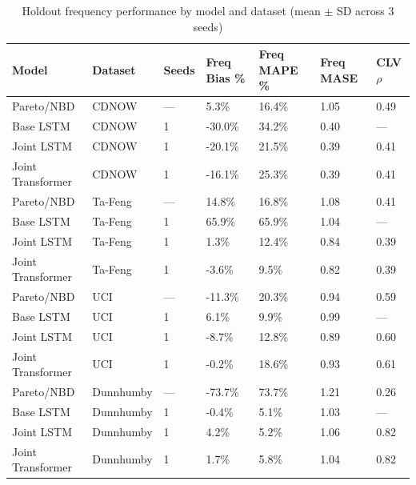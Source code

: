 \begin{table}
\caption{Holdout frequency performance by model and dataset (mean $\pm$ SD across 3 seeds)}
\label{tab:model_comparison_aggregated_freq}
\begin{tabular}{lllllll}
\toprule
Model & Dataset & Seeds & Freq Bias \% & Freq MAPE \% & Freq MASE & CLV $\rho$ \\
\midrule
Pareto/NBD & CDNOW & — & 5.3\% & 16.4\% & 1.05 & 0.49 \\
Base LSTM & CDNOW & 1 & -30.0\% & 34.2\% & 0.40 & — \\
Joint LSTM & CDNOW & 1 & -20.1\% & 21.5\% & 0.39 & 0.41 \\
Joint Transformer & CDNOW & 1 & -16.1\% & 25.3\% & 0.39 & 0.41 \\
Pareto/NBD & Ta-Feng & — & 14.8\% & 16.8\% & 1.08 & 0.41 \\
Base LSTM & Ta-Feng & 1 & 65.9\% & 65.9\% & 1.04 & — \\
Joint LSTM & Ta-Feng & 1 & 1.3\% & 12.4\% & 0.84 & 0.39 \\
Joint Transformer & Ta-Feng & 1 & -3.6\% & 9.5\% & 0.82 & 0.39 \\
Pareto/NBD & UCI & — & -11.3\% & 20.3\% & 0.94 & 0.59 \\
Base LSTM & UCI & 1 & 6.1\% & 9.9\% & 0.99 & — \\
Joint LSTM & UCI & 1 & -8.7\% & 12.8\% & 0.89 & 0.60 \\
Joint Transformer & UCI & 1 & -0.2\% & 18.6\% & 0.93 & 0.61 \\
Pareto/NBD & Dunnhumby & — & -73.7\% & 73.7\% & 1.21 & 0.26 \\
Base LSTM & Dunnhumby & 1 & -0.4\% & 5.1\% & 1.03 & — \\
Joint LSTM & Dunnhumby & 1 & 4.2\% & 5.2\% & 1.06 & 0.82 \\
Joint Transformer & Dunnhumby & 1 & 1.7\% & 5.8\% & 1.04 & 0.82 \\
\bottomrule
\end{tabular}
\end{table}
